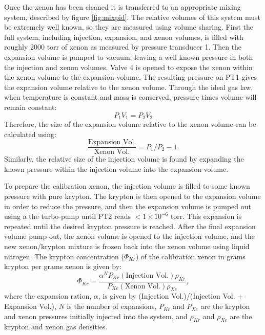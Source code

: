 \documentclass[12pt]{article}
\begin{document}
Once the xenon has been cleaned it is transferred to an appropriate mixing system, described by figure \ref{fig:mixpid}. The relative volumes of this system must be extremely well known, so they are measured using volume sharing. First the full system, including injection, expansion, and xenon volumes, is filled with roughly 2000 torr of xenon as measured by pressure transducer 1. Then the expansion volume is pumped to vacuum, leaving a well known pressure in both the injection and xenon volumes. Valve 4 is opened to expose the xenon within the xenon volume to the expansion volume. The resulting pressure on PT1 gives the expansion volume relative to the xenon volume. Through the ideal gas law, when temperature is constant and mass is conserved, pressure times volume will remain constant:
\begin{equation}
P_{1}V_{1} = P_{2}V_{2}
\end{equation}
Therefore, the size of the expansion volume relative to the xenon volume can be calculated using:
\begin{equation}
\frac{\textrm{Expansion Vol.}}{\textrm{Xenon Vol.}} = P_{1}/P_{2}-1.
\end{equation}
Similarly, the relative size of the injection volume is found by expanding the known pressure within the injection volume into the expansion volume. 

To prepare the calibration xenon, the injection volume is filled to some known pressure with pure krypton. The krypton is then opened to the expansion volume in order to reduce the pressure, and then the expansion volume is pumped out using a the turbo-pump until PT2 reads $<1\times10^{-6} \textrm{ torr}$. This expansion is repeated until the desired krypton pressure is reached. After the final expansion volume pump-out, the xenon volume is opened to the injection volume, and the new xenon/krypton mixture is frozen back into the xenon volume using liquid nitrogen. The krypton concentration ($\Phi_{Kr}$) of the calibration xenon in grams krypton per grams xenon is given by:
\begin{equation}
\Phi_{Kr} = \frac{\alpha^{N}P_{Kr}(\textrm{Injection Vol.})\rho_{Kr} }{P_{Xe}(\textrm{Xenon Vol.})\rho_{Xe}},
\end{equation}
where the expansion ration, $\alpha$, is given by (Injection Vol.)/(Injection Vol. + Expansion Vol.), $N$ is the number of expansions, $P_{Kr}$ and $P_{Xe}$ are the krypton and xenon pressures initially injected into the system, and $\rho_{Kr}$ and $\rho_{Xe}$ are the krypton and xenon gas densities.
\end{document}
